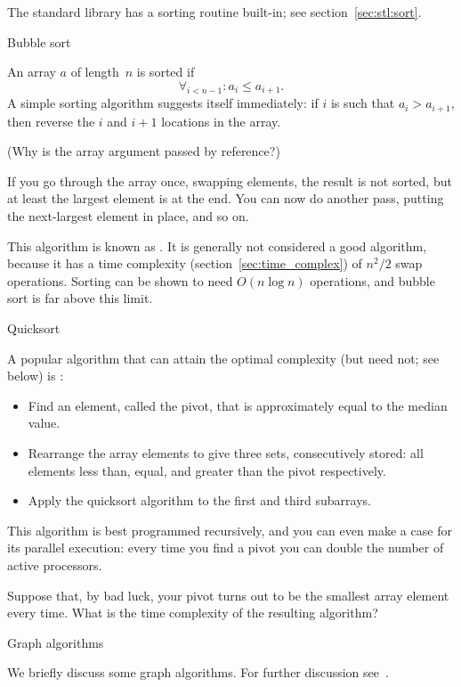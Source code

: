 The standard library has a sorting routine built-in;
see section~\ref{sec:stl:sort}.

 {Bubble sort}

An array $a$ of length~$n$ is sorted if
\[ \forall_{i<n-1}\colon a_i\leq a_{i+1}. \]
A simple sorting algorithm suggests itself immediately: if $i$ is such
that $a_i>a_{i+1}$, then reverse the $i$ and $i+1$ locations in the
array.


(Why is the array argument passed by reference?)

If you go through the array once, swapping elements, the result is not
sorted, but at least the largest element is at the end. You can now do
another pass, putting the next-largest element in place, and so on.

This algorithm is known as . It is generally
not considered a good algorithm, because it has a time complexity
(section~\ref{sec:time_complex}) of $n^2/2$ swap operations. Sorting
can be shown to need $O(n\log n)$ operations, and bubble sort is far
above this limit.

 {Quicksort}

A popular algorithm that can attain the optimal complexity (but need
not; see below) is :
\begin{itemize}
\item Find an element, called the pivot, that is approximately equal
  to the median value.
\item Rearrange the array elements to give three sets, consecutively
  stored: all elements less than, equal, and greater than the pivot
  respectively.
\item Apply the quicksort algorithm to the first and third subarrays.
\end{itemize}

This algorithm is best programmed recursively, and you can even make a
case for its parallel execution: every time you find a pivot you can
double the number of active processors.

\begin{exercise}
  Suppose that, by bad luck, your pivot turns out to be the smallest
  array element every time. What is the time complexity of the
  resulting algorithm?
\end{exercise}

 {Graph algorithms}

We briefly discuss some graph algorithms.
For further discussion see~.

